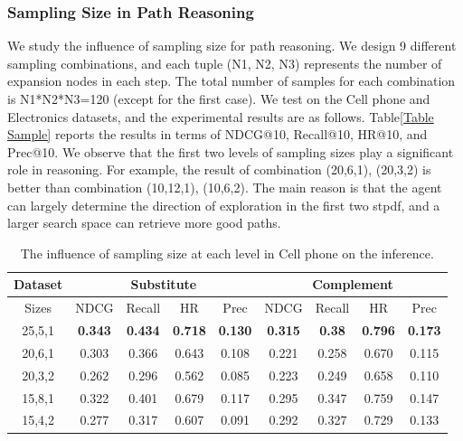\documentclass[review]{elsarticle}
\begin{document}
\begin{sloppypar}
\subsubsection{Sampling Size in Path Reasoning}
We study the influence of sampling size for path reasoning. We design 9 different sampling combinations, and each tuple (N1, N2, N3) represents the number of expansion nodes in each step. The total number of samples for each combination is N1*N2*N3=120 (except for the first case). We test on the Cell phone and Electronics datasets, and the experimental results are as follows. Table\ref{Table Sample} reports the results in terms of NDCG@10, Recall@10, HR@10, and Prec@10.
We observe that the first two levels of sampling sizes play a significant role in reasoning. For example, the result of combination (20,6,1), (20,3,2) is better than combination (10,12,1), (10,6,2). The main reason is that the agent can largely determine the direction of exploration in the first two stpdf, and a larger search space can retrieve more good paths.
\begin{table}[]
\caption{The influence of sampling size at each level in Cell phone on the inference.}
\small
\begin{tabular}{c|cccc|cccc}
\hline
Dataset & \multicolumn{4}{c|}{Substitute}                                   & \multicolumn{4}{c}{Complement}                                   \\ \hline
Sizes   & NDCG        & Recall      & HR          & Prec        & NDCG        & Recall     & HR          & Prec        \\ \hline
25,5,1  & \textbf{0.343} & \textbf{0.434} & \textbf{0.718} & \textbf{0.130} & \textbf{0.315} & \textbf{0.38} & \textbf{0.796} & \textbf{0.173} \\
20,6,1  & 0.303          & 0.366          & 0.643          & 0.108          & 0.221          & 0.258         & 0.670          & 0.115          \\
20,3,2  & 0.262          & 0.296          & 0.562          & 0.085          & 0.223          & 0.249         & 0.658          & 0.110          \\
15,8,1  & 0.322          & 0.401          & 0.679          & 0.117          & 0.295          & 0.347         & 0.759          & 0.147          \\
15,4,2  & 0.277          & 0.317          & 0.607          & 0.091          & 0.292          & 0.327         & 0.729          & 0.133          \\

\end{tabular}
\end{table}
\end{sloppypar}
\end{document}
